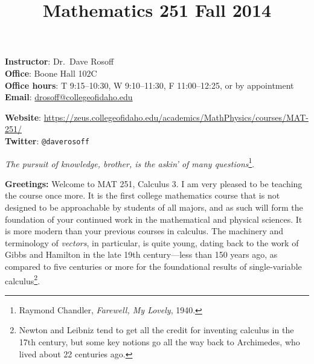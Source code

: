 \documentclass[12pt,twoside]{amsart}
\title{{\LARGE Mathematics 251 \hfill Fall 2014}}
\begin{document}
\maketitle
\thispagestyle{empty}
\vspace*{-2ex}
\begin{minipage}[t]{0.45\linewidth}
    \textbf{Instructor}: Dr.\ Dave Rosoff  \\
    \textbf{Office}: Boone Hall 102C \\
    \textbf{Office hours}: T 9:15--10:30, W 9:10--11:30, F 11:00--12:25, or by appointment \\
    \textbf{Email}: \href{mailto:drosoff@collegeofidaho.edu}{drosoff@collegeofidaho.edu} \\
\end{minipage} 
\hspace*{0.09\linewidth}
\begin{minipage}[t]{0.45\linewidth}\begin{flushright}
    \textbf{Website}: \url{https://zeus.collegeofidaho.edu/academics/MathPhysics/courses/MAT-251/} \\
    \textbf{Twitter}: \verb|@daverosoff|
\end{flushright}
\end{minipage}
\vspace*{-2ex}
\begin{center}

{\large \emph{The pursuit of knowledge, brother, is the askin' of many questions}\footnote{Raymond Chandler, \emph{Farewell, My Lovely}, 1940.}}.

\end{center}

\textbf{Greetings:} Welcome to MAT 251, Calculus 3. I am very pleased to be teaching the course once more. It is the first college mathematics course that is not designed to be approachable by students of all majors, and as such will form the foundation of your continued work in the mathematical and physical sciences. It is more modern than your previous courses in calculus. The machinery and terminology of \emph{vectors}, in particular, is quite young, dating back to the work of Gibbs and Hamilton in the late 19th century---less than 150 years ago, as compared to five centuries or more for the foundational results of single-variable calculus\footnote{Newton and Leibniz tend to get all the credit for inventing calculus in the 17th century, but some key notions go all the way back to Archimedes, who lived about 22 centuries ago.}.
\end{document}
